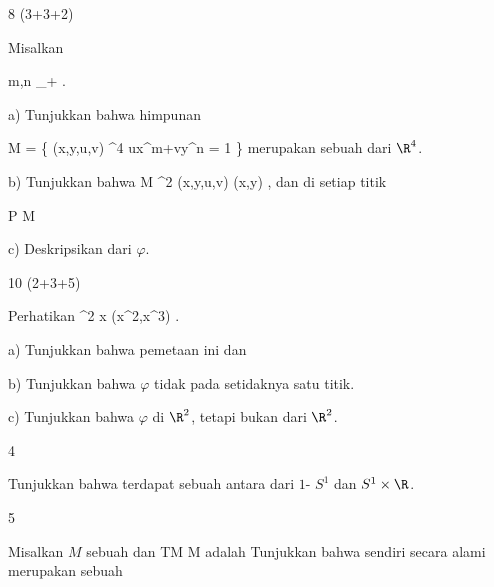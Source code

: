 {8 (3+3+2)}
{

Misalkan

\mavergleichskette
{\vergleichskette
{ m,n
}
{ \in }{\N_+
}
{  }{
}
{    }{
}
{   }{
}
}
{}{}{.}

a) Tunjukkan bahwa himpunan

\mavergleichskettedisp
{\vergleichskette
{ M
}
{ =} { \left\{ (x,y,u,v) \in \R^4  \mid  ux^m+vy^n = 1         \right\}
}
{ } {
}
{ } {
}
{ } {
}
}
{}{}{}
merupakan sebuah
dari $\R^4$.

b) Tunjukkan bahwa
\maabbeledisp {\varphi} { M } {\R^2
} {(x,y,u,v)} {(x,y)
} {,}
dan di setiap titik

\mavergleichskette
{\vergleichskette
{ P
}
{ \in }{ M
}
{  }{
}
{    }{
}
{   }{
}
}
{}{}{}

c) Deskripsikan
dari $\varphi$.

}
{} {}

{10 (2+3+5)}
{

Perhatikan
\maabbeledisp {\varphi} {\R} {\R^2
} { x } {(x^2,x^3)
} {.}

a) Tunjukkan bahwa pemetaan ini
dan

b) Tunjukkan bahwa $\varphi$ tidak
pada setidaknya satu titik.

c) Tunjukkan bahwa
$\varphi$
di $\R^2$, tetapi bukan
dari $\R^2$.

}
{} {}

{4}
{

Tunjukkan bahwa terdapat sebuah
antara
 dari
$1$- $S^1$ dan
 $S^1 \times \R$.

}
{} {}

{5}
{

Misalkan $M$ sebuah
dan
\maabbdisp {\pi} {TM} {M
} {}
adalah
Tunjukkan bahwa
 sendiri secara alami merupakan sebuah

}
{} {}


